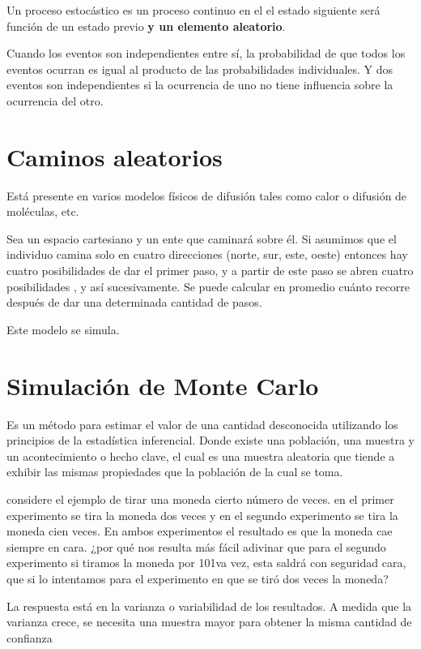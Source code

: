 Un proceso estocástico es un proceso continuo en el el estado siguiente será función de un estado previo \textbf{y un elemento aleatorio}.

Cuando los eventos son independientes entre sí, la probabilidad de que todos los eventos ocurran es igual al producto de las probabilidades individuales. Y dos eventos son independientes si la ocurrencia de uno no tiene influencia sobre la ocurrencia del otro. 

\section{Caminos aleatorios}

Está presente en varios modelos físicos de difusión tales como calor o difusión de moléculas, etc. 

Sea un espacio cartesiano y un ente que caminará sobre él. Si asumimos que el individuo camina solo en cuatro direcciones (norte, sur, este, oeste) entonces hay cuatro posibilidades de dar el primer paso, y a partir de este paso se abren cuatro posibilidades , y así sucesivamente. Se puede calcular en promedio cuánto recorre después de dar una determinada cantidad de pasos. 

Este modelo se simula.

\section{Simulación de Monte Carlo}

Es un método para estimar el valor de una cantidad desconocida utilizando los principios de la estadística inferencial. Donde existe una población, una muestra y un acontecimiento o hecho clave, el cual es una muestra aleatoria que tiende a exhibir las mismas propiedades que la población de la cual se toma.

considere el ejemplo de tirar una moneda cierto número de veces. en el primer experimento se tira la moneda dos veces y en el segundo experimento se tira la moneda cien veces. En ambos experimentos el resultado es que la moneda cae siempre en cara. ¿por qué nos resulta más fácil adivinar que para el segundo experimento si tiramos la moneda por 101va vez, esta saldrá con seguridad cara, que si lo intentamos para el experimento en que se tiró dos veces la moneda?

La respuesta está en la varianza o variabilidad de los resultados. A medida que la varianza crece, se necesita una muestra mayor para obtener la misma cantidad de confianza 

